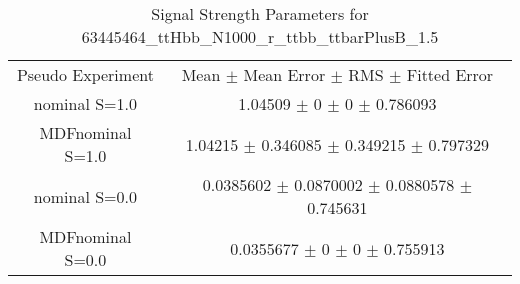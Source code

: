 \begin{table}
\centering
\caption{Signal Strength Parameters for 63445464\_ttHbb\_N1000\_r\_ttbb\_ttbarPlusB\_1.5}
\begin{tabular}{cc}
\toprule
Pseudo Experiment & Mean $\pm$ Mean Error $\pm$ RMS $\pm$ Fitted Error\\
nominal S=1.0 & \num{1.04509} $\pm$ \num{0} $\pm$ \num{0} $\pm$ \num{0.786093}\\
MDFnominal S=1.0 & \num{1.04215} $\pm$ \num{0.346085} $\pm$ \num{0.349215} $\pm$ \num{0.797329}\\
nominal S=0.0 & \num{0.0385602} $\pm$ \num{0.0870002} $\pm$ \num{0.0880578} $\pm$ \num{0.745631}\\
MDFnominal S=0.0 & \num{0.0355677} $\pm$ \num{0} $\pm$ \num{0} $\pm$ \num{0.755913}\\
\bottomrule
\end{tabular}
\end{table}